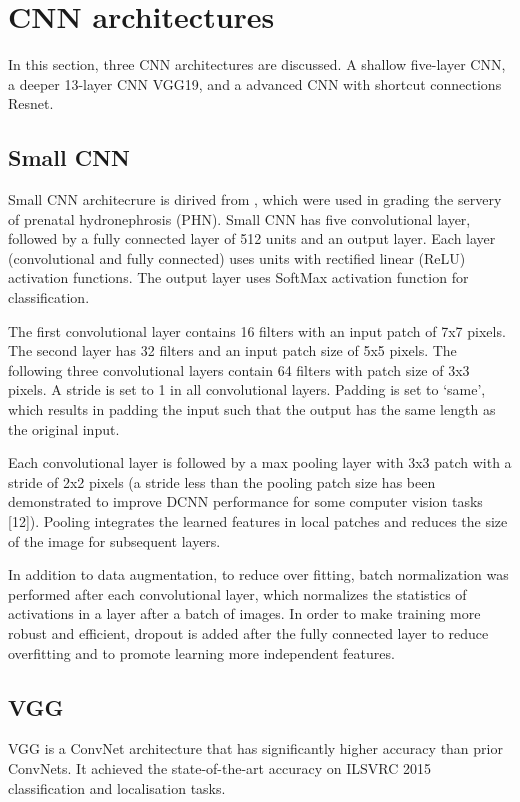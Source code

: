 \chapter{CNN architectures} 

In this section, three CNN architectures are discussed. A shallow five-layer CNN, a deeper 13-layer CNN VGG19, and a advanced CNN with shortcut connections Resnet.

\section{Small CNN}
Small CNN architecrure is dirived from \cite{Dhindsa2018}, which were used in grading the servery of prenatal hydronephrosis (PHN). Small CNN has five convolutional layer, followed by a fully connected layer of 512 units and an output layer. Each layer (convolutional and fully connected) uses units with rectified linear (ReLU) activation functions. The output layer uses SoftMax activation function for classification. 

The first convolutional layer contains 16 filters with an input patch of 7x7 pixels. The second layer has 32 filters and an input patch size of 5x5 pixels. The following three convolutional layers contain 64 filters with patch size of 3x3 pixels. A stride is set to 1 in all convolutional layers. Padding is set to ‘same’, which results in padding the input such that the output has the same length as the original input.

Each convolutional layer is followed by a max pooling layer with 3x3 patch with a stride of 2x2 pixels (a stride less than the pooling patch size has been demonstrated to improve DCNN performance for some computer vision tasks [12]). Pooling integrates the learned features in local patches and reduces the size of the image for subsequent layers. 

In addition to data augmentation, to reduce over fitting, batch normalization was performed after each convolutional layer, which normalizes the statistics of activations in a layer after a batch of images. In order to make training more robust and efficient, dropout is added after the fully connected layer to reduce overfitting and to promote learning more independent features.

\section{VGG}
VGG \citep{vgg} is a ConvNet architecture that has significantly higher accuracy than prior ConvNets. It achieved the state-of-the-art accuracy on ILSVRC 2015 classification and localisation tasks. 

